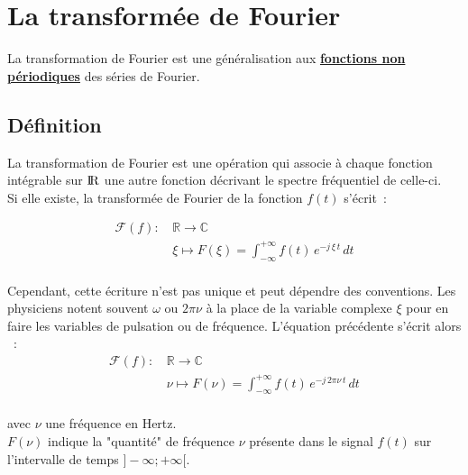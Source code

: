 \section{La transformée de Fourier}

La transformation de Fourier est une généralisation aux \textbf{\underline{fonctions non périodiques}} des séries de Fourier.

\subsection*{Définition}

La transformation de Fourier est une opération qui associe à chaque fonction intégrable sur ${\rm I\!R}$ une autre fonction décrivant le spectre fréquentiel de celle-ci. \\

Si elle existe, la transformée de Fourier de la fonction $f(t)$ s'écrit~:

\begin{equation*}
	\begin{split}
		\mathcal{F}(f): \, & \mathbb{R} \rightarrow  \mathbb{C}  \\	
		& \xi \mapsto F(\xi)=\int_{-\infty}^{+\infty}f(t)\,e^{-j\,\xi\,t}\,dt \\
	\end{split}
\end{equation*}

Cependant, cette écriture n'est pas unique et peut dépendre des conventions. Les physiciens notent souvent $\omega$ ou $2\pi\nu$ à la place de la variable complexe $\xi$ pour en faire les variables de pulsation ou de fréquence. L'équation précédente s'écrit alors ~: \\


\begin{equation}
	\begin{split}
		\mathcal{F}(f): \, & \mathbb{R} \rightarrow  \mathbb{C}  \\	
		& \nu \mapsto F(\nu)=\int_{-\infty}^{+\infty}f(t)\,e^{-j\,2\pi\nu\,t}\,dt \\
	\end{split}
\end{equation}

avec $\nu$ une fréquence en Hertz. \\

$F(\nu)$ indique la "quantité" de fréquence $\nu$ présente dans le signal $f(t)$ sur l'intervalle de temps $]-\infty;+\infty[$. \\

